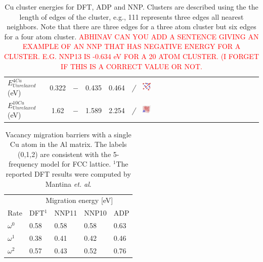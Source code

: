\documentclass{article}
\begin{document}
\begin{table}[H]
\begin{tabular}{l|cccccV}
$E^{4Cu}_{Unrelaxed}$(eV)&0.322& $-$ &0.435&0.464&\emph{ / }&  \includegraphics[width=0.07\textwidth]{figures/SoluteCluster_111122.png}\\%
$E^{10Cu}_{Unrelaxed}$(eV)&1.62& $-$ &1.589& 2.254 &\emph{ / }&  \includegraphics[width=0.07\textwidth]{figures/SoluteCluster_10atoms.png}\\%
\hline%
\end{tabular}%
\caption{Cu cluster energies for DFT, ADP and NNP. Clusters are described using the the length of edges of the cluster, e.g., 111 represents three edges all nearest neighbors. Note that there are three edges for a three atom cluster but six edges for a four atom cluster. \textcolor{red}{ABHINAV CAN YOU ADD A SENTENCE GIVING AN EXAMPLE OF AN NNP THAT HAS NEGATIVE ENERGY FOR A CLUSTER. E.G. NNP13 IS -0.634 eV FOR A 20 ATOM CLUSTER. (I FORGET IF THIS IS A CORRECT VALUE OR NOT.}}
\label{table:solute_cluster}
\end{table}


\begin{table}[H]
	\centering
	\begin{tabular}{lllll}
		\toprule
		& \multicolumn{4}{c}{Migration energy [eV]}                   \\
		\cmidrule(r){2-5}
		Rate         & DFT$^1$                & NNP11 & NNP10 & ADP \\
		\midrule
		$\omega^{0}$ & 0.58 & 0.58 & 0.58 & 0.63 \\
		$\omega^{1}$ & 0.38 & 0.41 & 0.42 & 0.46 \\
		$\omega^{2}$ & 0.57 & 0.43 & 0.52 & 0.76 \\
		\bottomrule
	\end{tabular}
	\caption{Vacancy migration barriers with a single Cu atom in the Al matrix. The labels (0,1,2) are consistent with the 5-frequency model for FCC lattice. $^1$The reported DFT results were computed by Mantina \textit{et. al}\cite{Mantina2009FirstCoefficients}.}
	\label{tab:vacmig}
\end{table}
\end{document}
